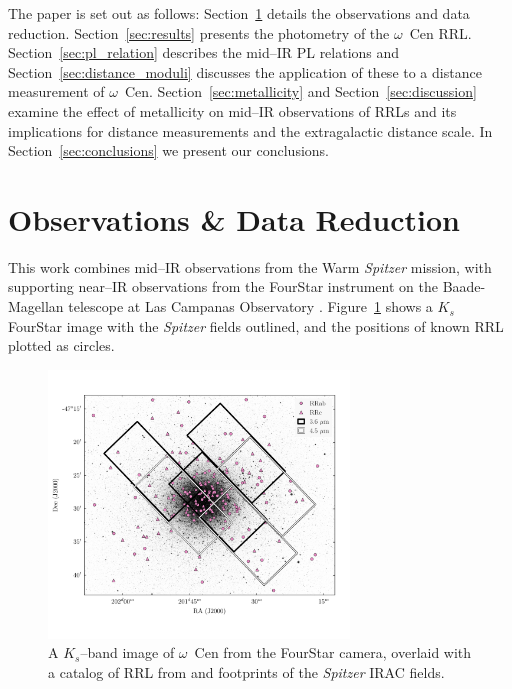 \documentclass[a4paper,fleqn,usenatbib]{mnras}
\begin{document}
The paper is set out as follows: Section~\ref{sec:observations} details the observations and data reduction. Section~\ref{sec:results} presents the photometry of the $\omega$~Cen RRL. Section~\ref{sec:pl_relation} describes the mid--IR PL relations and Section~\ref{sec:distance_moduli} discusses the application of these to a distance measurement of  $\omega$~Cen. Section~\ref{sec:metallicity} and Section~\ref{sec:discussion} examine the effect of metallicity on mid--IR observations of RRLs and its implications for distance measurements and the extragalactic distance scale. In Section~\ref{sec:conclusions} we present our conclusions.

\section{Observations \& Data Reduction}
\label{sec:observations}
This work combines mid--IR observations from the Warm {\it Spitzer} mission, with supporting near--IR observations from the FourStar instrument on the Baade-Magellan telescope at Las Campanas Observatory \citep{2013PASP..125..654P}. Figure~\ref{fig:omegaCen_fields} shows a $K_s$ FourStar image with the {\it Spitzer} fields outlined, and the positions of known RRL plotted as circles.

\begin{figure}
\begin{center}
\includegraphics[width=80mm]{reworked_fitting_code/final_plots/omegacen_coverage_map_new.pdf}
\caption{A $K_s$--band image of $\omega$~Cen from the FourStar camera, overlaid with a catalog of RRL from \citet{2004A&A...424.1101K} and footprints of the {\it Spitzer} IRAC fields.}
\label{fig:omegaCen_fields}
\end{center}
\end{figure}
\end{document}
